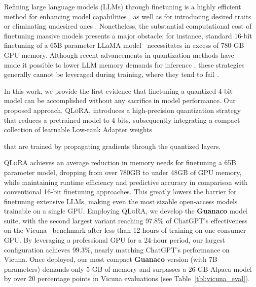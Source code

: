 Refining large language models (LLMs) through finetuning is a highly efficient method for enhancing model capabilities \citep{min2021metaicl, wei2021finetuned, ouyang2022training, wang2022super, wang2022self, liu2022few}, as well as for introducing desired traits or eliminating undesired ones \citep{ouyang2022training,askell2021general,bai2022training}. Nonetheless, the substantial computational cost of finetuning massive models presents a major obstacle; for instance, standard 16-bit finetuning of a 65B parameter LLaMA model~\citep{touvron2023llama} necessitates in excess of 780 GB GPU memory. Although recent advancements in quantization methods have made it possible to lower LLM memory demands for inference \citep{dettmers2022llm, dettmers2022case, frantar2022gptq, xiao2022smoothquant}, these strategies generally cannot be leveraged during training, where they tend to fail \citep{wortsman2023stable}.

In this work, we provide the first evidence that finetuning a quantized 4-bit model can be accomplished without any sacrifice in model performance. Our proposed approach, \textsc{QLoRA}, introduces a high-precision quantization strategy that reduces a pretrained model to 4 bits, subsequently integrating a compact collection of learnable Low-rank Adapter weights \citep{hu2021lora} 

that are trained by propagating gradients through the quantized layers. 

\textsc{QLoRA} achieves an average reduction in memory needs for finetuning a 65B parameter model, dropping from over 780GB to under 48GB of GPU memory, while maintaining runtime efficiency and predictive accuracy in comparison with conventional 16-bit finetuning approaches. This greatly lowers the barrier for finetuning extensive LLMs, making even the most sizable open-access models trainable on a single GPU. Employing \textsc{QLoRA}, we develop the \textbf{Guanaco} model suite, with the second largest variant reaching 97.8\% of ChatGPT’s effectiveness on the Vicuna~\citep{vicuna2023} benchmark after less than 12 hours of training on one consumer GPU. By leveraging a professional GPU for a 24-hour period, our largest configuration achieves 99.3\%, nearly matching ChatGPT's performance on Vicuna. Once deployed, our most compact \textbf{Guanaco} version (with 7B parameters) demands only 5 GB of memory and surpasses a 26 GB Alpaca model by over 20 percentage points in Vicuna evaluations (see Table~\ref{tbl:vicuna_eval}).

